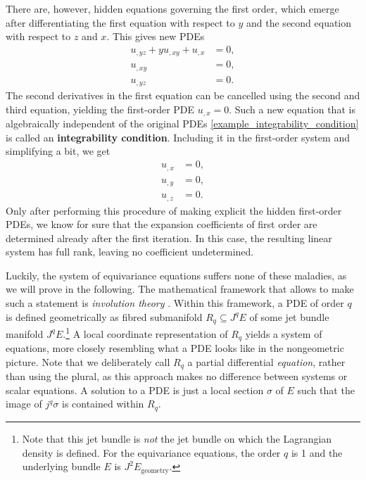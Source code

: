 \begin{example}
  There are, however, hidden equations governing the first order, which emerge after differentiating the first equation with respect to $y$ and the second equation with respect to $z$ and $x$. This gives new PDEs
  \begin{equation}
    \begin{aligned}
      u_{,yz} + y u_{,xy} + u_{,x} &{} = 0, \\
      u_{,xy} &{} = 0, \\
      u_{,yz} &{} = 0.
    \end{aligned}
  \end{equation}
  The second derivatives in the first equation can be cancelled using the second and third equation, yielding the first-order PDE $u_{,x} = 0$. Such a new equation that is algebraically independent of the original PDEs \eqref{example_integrability_condition} is called an \textbf{integrability condition}. Including it in the first-order system and simplifying a bit, we get
  \begin{equation}
    \begin{aligned}
      u_{,x} &{} = 0, \\
      u_{,y} &{} = 0, \\
      u_{,z} &{} = 0.
    \end{aligned}
  \end{equation}
  Only after performing this procedure of making explicit the hidden first-order PDEs, we know for sure that the expansion coefficients of first order are determined already after the first iteration. In this case, the resulting linear system has full rank, leaving no coefficient undetermined.
\end{example}
Luckily, the system of equivariance equations suffers none of these maladies, as we will prove in the following. The mathematical framework that allows to make such a statement is \emph{involution theory} \cite{Seiler_2010}. Within this framework, a PDE of order $q$ is defined geometrically as fibred submanifold $R_q\subseteq J^qE$ of some jet bundle manifold $J^qE$.\footnote{Note that this jet bundle is \emph{not} the jet bundle on which the Lagrangian density is defined. For the equivariance equations, the order $q$ is 1 and the underlying bundle $E$ is $J^2E_\text{geometry}$.} A local coordinate representation of $R_q$ yields a system of equations, more closely resembling what a PDE looks like in the nongeometric picture. Note that we deliberately call $R_q$ a partial differential \emph{equation}, rather than using the plural, as this approach makes no difference between systems or scalar equations. A solution to a PDE is just a local section $\sigma$ of $E$ such that the image of $j^q\sigma$ is contained within $R_q$.

